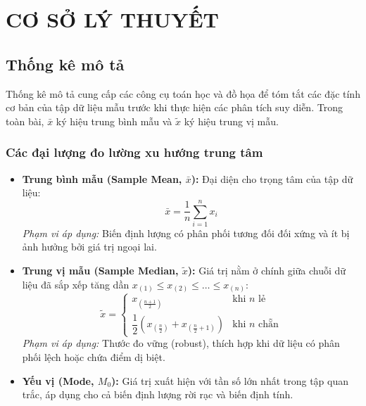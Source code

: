 \documentclass[12pt,a4paper]{article}
\newcommand{\xbar}{\bar{x}}
\newcommand{\xmed}{\tilde{x}}
\begin{document}
\section{CƠ SỞ LÝ THUYẾT}

\subsection{Thống kê mô tả}

Thống kê mô tả cung cấp các công cụ toán học và đồ họa để tóm tắt các đặc tính cơ bản của tập
dữ liệu mẫu trước khi thực hiện các phân tích suy diễn. Trong toàn bài, $\xbar$ ký hiệu trung
bình mẫu và $\xmed$ ký hiệu trung vị mẫu.

\subsubsection{Các đại lượng đo lường xu hướng trung tâm}

\begin{itemize}
  \item \textbf{Trung bình mẫu (Sample Mean, $\xbar$):} Đại diện cho trọng tâm của tập dữ liệu:
  \begin{equation}
    \xbar = \frac{1}{n}\sum_{i=1}^{n} x_i
  \end{equation}
  \textit{Phạm vi áp dụng:} Biến định lượng có phân phối tương đối đối xứng và ít bị ảnh hưởng
  bởi giá trị ngoại lai.

  \item \textbf{Trung vị mẫu (Sample Median, $\xmed$):} Giá trị nằm ở chính giữa chuỗi dữ liệu
  đã sắp xếp tăng dần $x_{(1)} \le x_{(2)} \le \dots \le x_{(n)}$:
  \begin{equation}
    \xmed =
    \begin{cases}
      x_{\left(\frac{n+1}{2}\right)} & \text{khi } n \text{ lẻ}\\[0.4em]
      \dfrac{1}{2}\left(x_{\left(\frac{n}{2}\right)} + x_{\left(\frac{n}{2}+1\right)}\right) & \text{khi } n \text{ chẵn}
    \end{cases}
  \end{equation}
  \textit{Phạm vi áp dụng:} Thước đo vững (robust), thích hợp khi dữ liệu có phân phối lệch
  hoặc chứa điểm dị biệt.

  \item \textbf{Yếu vị (Mode, $M_0$):} Giá trị xuất hiện với tần số lớn nhất trong tập quan
  trắc, áp dụng cho cả biến định lượng rời rạc và biến định tính.
\end{itemize}
\end{document}
